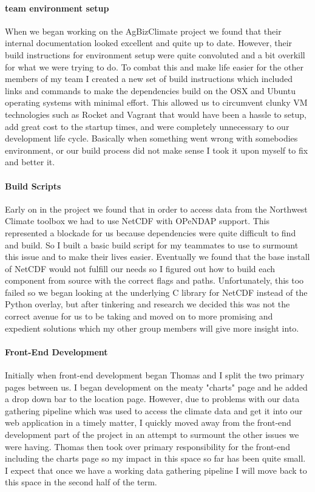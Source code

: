 \documentclass[onecolumn, draftclsnofoot,10pt, compsoc]{article}
\begin{document}
	\paragraph{team environment setup}
        When we began working on the AgBizClimate project we found that their internal documentation looked excellent and quite up to date. However, their build instructions for environment setup were quite convoluted and a bit overkill for what we were trying to do. To combat this and make life easier for the other members of my team I created a new set of build instructions which included links and commands to make the dependencies build on the OSX and Ubuntu operating systems with minimal effort. This allowed us to circumvent clunky VM technologies such as Rocket and Vagrant that would have been a hassle to setup, add great cost to the startup times, and were completely unnecessary to our development life cycle. Basically when something went wrong with somebodies environment, or our build process did not make sense I took it upon myself to fix and better it.
        \paragraph{Build Scripts}
	Early on in the project we found that in order to access data from the Northwest Climate toolbox we had to use NetCDF with OPeNDAP support. This represented a blockade for us because dependencies were quite difficult to find and build. So I built a basic build script for my teammates to use to surmount this issue and to make their lives easier. Eventually we found that the base install of NetCDF would not fulfill our needs so I figured out how to build each component from source with the correct flags and paths. Unfortunately, this too failed so we began looking at the underlying C library for NetCDF instead of the Python overlay, but after tinkering and research we decided this was not the correct avenue for us to be taking and moved on to more promising and expedient solutions which my other group members will give more insight into.
        \paragraph{Front-End Development}
        Initially when front-end development began Thomas and I split the two primary pages between us. I began development on the meaty "charts" page and he added a drop down bar to the location page. However, due to problems with our data gathering pipeline which was used to access the climate data and get it into our web application in a timely matter, I quickly moved away from the front-end development part of the project in an attempt to surmount the other issues we were having. Thomas then took over primary responsibility for the front-end including the charts page so my impact in this space so far has been quite small. I expect that once we have a working data gathering pipeline I will move back to this space in the second half of the term.
\end{document}
